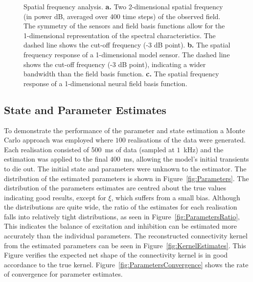 \documentclass[10pt,a4paper]{article}
\begin{document}
\begin{figure}
\begin{center}
	\end{center}
	\caption{Spatial frequency analysis. \textbf{a.} Two 2-dimensional spatial frequency (in power dB, averaged over 400 time steps) of the observed field. The symmetry of the sensors and field basis functions allow for the 1-dimensional representation of the spectral characteristics. The dashed line shows the cut-off frequency (-3 dB point). \textbf{b.} The spatial frequency response of a 1-dimensional model sensor. The dashed line shows the cut-off frequency (-3 dB point), indicating a wider bandwidth than the field basis function. \textbf{c.} The spatial frequency response of a 1-dimensional neural field basis function.} 
\end{figure}

\subsection{State and Parameter Estimates} 
\label{sec:state_and_param_results}
To demonstrate the performance of the parameter and state estimation a Monte Carlo approach was employed where $100$ realisations of the data were generated. Each realisation consisted of 500~ms of data (sampled at $1$~kHz) and the estimation was applied to the final $400$~ms, allowing the model's initial transients to die out. The initial state and parameters were unknown to the estimator. The distribution of the estimated parameters is shown in Figure~\ref{fig:Parameters}. The distribution of the parameters estimates are centred about the true values indicating good results, except for $\xi$, which suffers from a small bias. Although the distributions are quite wide, the ratio of the estimates for each realisation falls into relatively tight distributions, as seen in Figure~\ref{fig:ParametersRatio}, This indicates the balance of excitation and inhibition can be estimated more accurately than the individual parameters. The reconstructed connectivity kernel from the estimated parameters can be seen in Figure~\ref{fig:KernelEstimates}. This Figure verifies the expected net shape of the connectivity kernel is in good accordance to the true kernel. Figure~\ref{fig:ParametersConvergence} shows the rate of convergence for parameter estimates.
\end{document}
